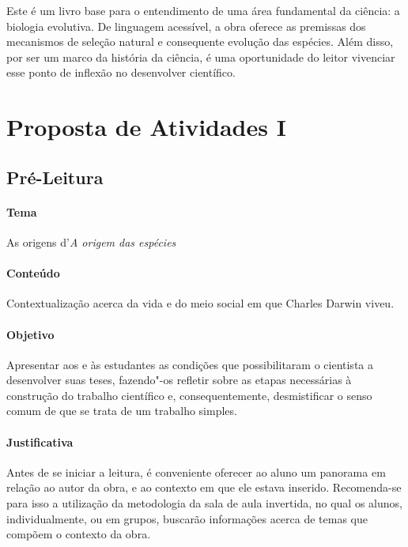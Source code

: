 \documentclass[11pt]{extarticle}
\begin{document}
Este é um livro base para o entendimento de uma área fundamental da ciência:
a biologia evolutiva. De linguagem acessível, a obra oferece as premissas dos mecanismos de seleção
natural e consequente evolução das espécies.
Além disso, por ser um marco da história da ciência, é uma oportunidade do
leitor vivenciar esse ponto de inflexão no desenvolver científico.





\section{Proposta de Atividades I}


\subsection{Pré-Leitura}

\paragraph{Tema} As origens d'\textit{A origem das espécies}

\paragraph{Conteúdo} Contextualização acerca da vida e do meio social
em que Charles Darwin viveu.

\paragraph{Objetivo} Apresentar aos e às estudantes as condições
que possibilitaram o cientista a desenvolver suas teses, fazendo"-os
refletir sobre as etapas necessárias à construção do trabalho científico
e, consequentemente, desmistificar o senso comum de que se trata de 
um trabalho simples.

\paragraph{Justificativa} Antes de se iniciar a leitura, é conveniente oferecer ao 
aluno um panorama em
relação ao autor da obra, e ao contexto em que ele estava inserido.
Recomenda-se para isso a utilização da metodologia da sala de aula invertida,
no qual os alunos, individualmente, ou em grupos, buscarão informações acerca
de temas que compõem o contexto da obra.
\end{document}
